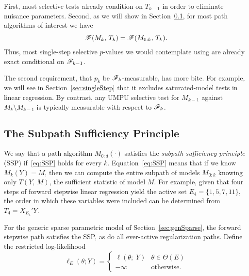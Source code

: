 \documentclass{article}
\begin{document}
First, most selective tests already condition on $T_{k-1}$ in order to eliminate nuisance parameters. Second, as we will show in Section~\ref{sec:SSP}, for most path algorithms of interest we have
\begin{equation}\label{eq:SSP}
\mathscr{F}(M_k, \, T_k) = \mathscr{F}(M_{0:k}, \, T_k).
\end{equation}
Thus, most single-step selective $p$-values we would contemplate using are already exact conditional on $\mathscr{F}_{k-1}$.

The second requirement, that $p_k$ be $\mathscr{F}_k$-measurable, has more bite. For example, we will see in Section~\ref{sec:singleStep} that it excludes saturated-model tests in linear regression. By contrast, any UMPU selective test for $M_{k-1}$ against $M_k\setminus M_{k-1}$ is typically measurable with respect to $\mathscr{F}_k$.


\subsection{The Subpath Sufficiency Principle}\label{sec:SSP}


We say that a path algorithm $M_{0:d}(\cdot)$ satisfies the {\em subpath sufficiency principle} (SSP) if~\eqref{eq:SSP} holds for every $k$. Equation~\eqref{eq:SSP} means that if we know $M_k(Y) = M$, then we can compute the entire subpath of models $M_{0:k}$ knowing only $T(Y, \, M)$, the sufficient statistic of model $M$. For example, given that four steps of forward stepwise linear regression yield the active set $E_4 = \{1,5,7,11\}$, the order in which these variables were included can be determined from $T_4 = X_{E_4}'Y$.

For the generic sparse parametric model of Section~\ref{sec:genSparse}, the forward stepwise path satisfies the SSP, as do all ever-active regularization paths. 
Define the restricted log-likelihood
\begin{equation}
\ell_E(\theta; Y) = \left\{\begin{matrix} 
    \ell(\theta; \;Y) & \theta \in \Theta(E)\\ 
    -\infty  & \mathrm{ otherwise.}\end{matrix}\right. 
\end{equation}
\end{document}
